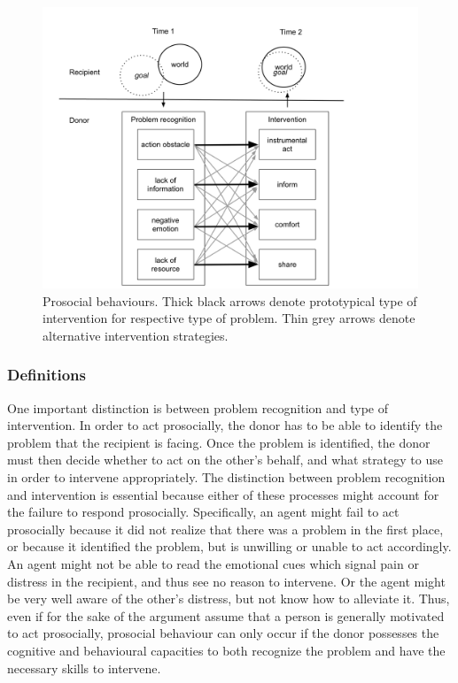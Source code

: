 \documentclass{article}
\begin{document}
\begin{figure}
\center
\includegraphics[width=0.9\columnwidth]{figs/prosocial_behaviours.png}
\caption{Prosocial behaviours. Thick black arrows denote prototypical type of
intervention for respective type of problem. Thin grey arrows denote
alternative intervention strategies.}
\label{fig-prosocial}
\end{figure}

\subsubsection{Definitions}

One important distinction is between problem recognition and type of
intervention. In order to act prosocially, the donor has to be able to identify
the problem that the recipient is facing. Once the problem is identified, the
donor must then decide whether to act on the other's behalf, and what
strategy to use in order to intervene appropriately. The distinction between
problem recognition and intervention is essential because either of these
processes might account for the failure to respond prosocially. Specifically,
an agent might fail to act prosocially because it did not realize that there
was a problem in the first place, or because it identified the problem, but is
unwilling or unable to act accordingly. An agent might not be able to read the
emotional cues which signal pain or distress in the recipient, and thus see no
reason to intervene. Or the agent might be very well aware of the other's
distress, but not know how to alleviate it. Thus, even if for the sake of the
argument assume that a person is generally motivated to act prosocially,
prosocial behaviour can only occur if the donor possesses the cognitive and
behavioural capacities to both recognize the problem and have the necessary
skills to intervene.
\end{document}
